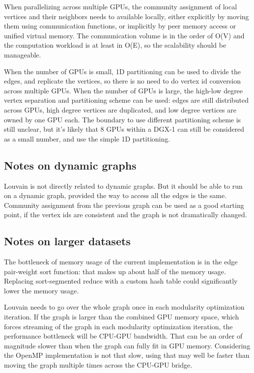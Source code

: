 \documentclass[10pt,oneside]{memoir}
\begin{document}
When parallelizing across multiple GPUs, the community assignment of
local vertices and their neighbors needs to available locally, either
explicitly by moving them using communication functions, or implicitly
by peer memory access or unified virtual memory. The communication
volume is in the order of O(\textbar{}V\textbar{}) and the computation
workload is at least in O(\textbar{}E\textbar{}), so the scalability
should be manageable.

When the number of GPUs is small, 1D partitioning can be used to divide
the edges, and replicate the vertices, so there is no need to do vertex
id conversion across multiple GPUs. When the number of GPUs is large,
the high-low degree vertex separation and partitioning scheme can be
used: edges are still distributed across GPUs, high degree vertices are
duplicated, and low degree vertices are owned by one GPU each. The
boundary to use different partitioning scheme is still unclear, but it's
likely that 8 GPUs within a DGX-1 can still be considered as a small
number, and use the simple 1D partitioning.

\hypertarget{notes-on-dynamic-graphs-4}{%
\subsection{Notes on dynamic graphs}\label{notes-on-dynamic-graphs-4}}

Louvain is not directly related to dynamic graphs. But it should be able
to run on a dynamic graph, provided the way to access all the edges is
the same. Community assignment from the previous graph can be used as a
good starting point, if the vertex ids are consistent and the graph is
not dramatically changed.

\hypertarget{notes-on-larger-datasets-4}{%
\subsection{Notes on larger datasets}\label{notes-on-larger-datasets-4}}

The bottleneck of memory usage of the current implementation is in the
edge pair-weight sort function: that makes up about half of the memory
usage. Replacing sort-segmented reduce with a custom hash table could
significantly lower the memory usage.

Louvain needs to go over the whole graph once in each modularity
optimization iteration. If the graph is larger than the combined GPU
memory space, which forces streaming of the graph in each modularity
optimization iteration, the performance bottleneck will be CPU-GPU
bandwidth. That can be an order of magnitude slower than when the graph
can fully fit in GPU memory. Considering the OpenMP implementation is
not that slow, using that may well be faster than moving the graph
multiple times across the CPU-GPU bridge.
\end{document}
